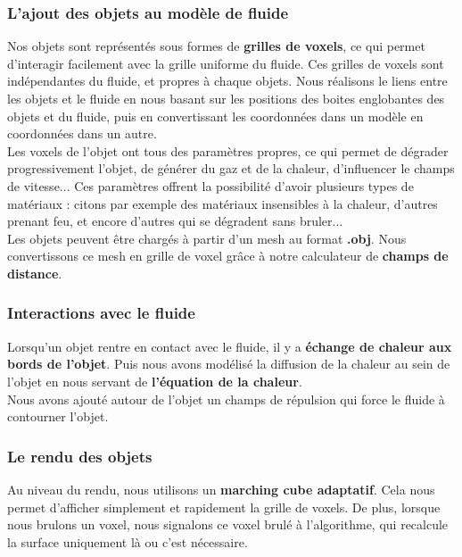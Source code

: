 \documentclass[a4paper,10pt]{article}
\begin{document}
\subsubsection{L'ajout des objets au modèle de fluide}
Nos objets sont représentés sous formes de \textbf{grilles de voxels}, ce qui 
permet d'interagir facilement avec la grille uniforme du fluide.
Ces grilles de voxels sont indépendantes du fluide, et propres à chaque objets.
Nous réalisons le liens entre les objets et le fluide en nous basant 
sur les positions des boites englobantes des objets et du fluide,
puis en convertissant les coordonnées dans un modèle en coordonnées dans un autre.\\
Les voxels de l'objet ont tous des paramètres propres, ce qui permet
de dégrader progressivement l'objet, de générer du gaz et de la chaleur,
d'influencer le champs de vitesse... Ces paramètres offrent la possibilité d'avoir
plusieurs types de matériaux : citons par exemple des matériaux insensibles à
la chaleur, d'autres prenant feu, et encore d'autres qui se dégradent sans bruler...\\

Les objets peuvent être chargés à partir d'un mesh au format \textbf{.obj}. 
Nous convertissons ce mesh en grille de voxel grâce à notre calculateur de 
\textbf{champs de distance}.

\subsubsection{Interactions avec le fluide}
Lorsqu'un objet rentre en contact avec le fluide, il y a \textbf{échange de chaleur aux
bords de l'objet}. Puis nous avons modélisé la diffusion de la chaleur au sein
de l'objet en nous servant de \textbf{l'équation de la chaleur}.\\
Nous avons ajouté autour de l'objet un champs de répulsion qui force le fluide
à contourner l'objet.

\subsubsection{Le rendu des objets}
Au niveau du rendu, nous utilisons un \textbf{marching cube adaptatif}. Cela nous permet
d'afficher simplement et rapidement la grille de voxels. De plus, lorsque nous brulons un voxel,
nous signalons ce voxel brulé à l'algorithme, qui recalcule la surface uniquement 
là ou c'est nécessaire.
\end{document}
